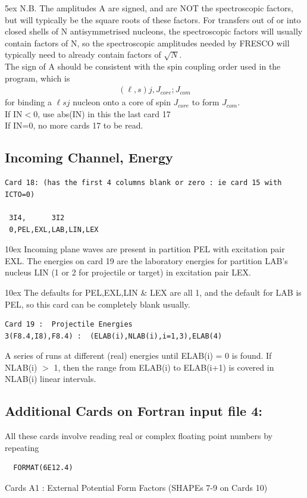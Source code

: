 \documentclass[11pt]{article}
\newcommand{\beqn}{\begin{eqnarray*}}
\newcommand{\eeqn}{\end{eqnarray*}}
\begin{document}
\hangindent 5ex
N.B. The amplitudes A are signed, and are NOT the spectroscopic
factors, but will typically be the square roots of these factors.
For transfers out of or into closed shells of N antisymmetrised nucleons,
the spectroscopic factors will usually contain factors of N,
so the spectroscopic amplitudes needed by FRESCO will typically
need to already contain factors of $\sqrt{N}$.
\\
The sign of A should be consistent with the spin coupling order used in
the program, which is
\beqn
  (\ell,s)j, J_{core}; J_{com}
\eeqn
for binding a $\ell sj$ nucleon onto a core of spin $J_{core}$ to form $J_{com}$.
\\
 If IN$<$0, use abs(IN) in this the last card 17\\
 If IN=0, no more cards 17 to be read.

\subsection{Incoming Channel, Energy}

\begin{verbatim}
Card 18: (has the first 4 columns blank or zero : ie card 15 with ICTO=0)

 3I4,      3I2
 0,PEL,EXL,LAB,LIN,LEX
\end{verbatim}

\hangindent 10ex
Incoming plane waves are present in partition PEL with excitation
pair EXL.  The energies on card 19 are the laboratory energies for
partition LAB's nucleus LIN (1 or 2 for projectile or target)
in excitation pair LEX.

\hangindent 10ex
The defaults for PEL,EXL,LIN \& LEX are all 1, and the default
for LAB is PEL, so this card can be completely blank usually.
\bigskip

\begin{verbatim}
Card 19 :  Projectile Energies
3(F8.4,I8),F8.4) :  (ELAB(i),NLAB(i),i=1,3),ELAB(4)
\end{verbatim}
A series of runs at different
(real)
energies until ELAB(i) = 0 is found.
 If NLAB(i) $>$ 1, then the range from ELAB(i) to ELAB(i+1) is covered
in NLAB(i) linear intervals.

\subsection{Additional Cards on Fortran input file 4:}
%
\bigskip
All these cards involve reading real or complex floating point numbers
by repeating
\begin{verbatim}
  FORMAT(6E12.4)
\end{verbatim}
Cards A1 :  External Potential Form Factors (SHAPEs 7-9 on Cards 10)
\bigskip
\end{document}
